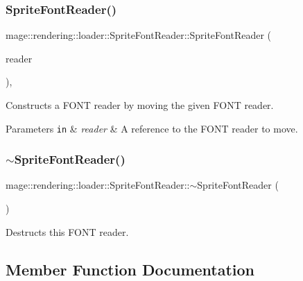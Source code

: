 \subsubsection{\texorpdfstring{Sprite\+Font\+Reader()}{SpriteFontReader()}\hspace{0.1cm}{\footnotesize\ttfamily [3/3]}}
{\footnotesize\ttfamily mage\+::rendering\+::loader\+::\+Sprite\+Font\+Reader\+::\+Sprite\+Font\+Reader (\begin{DoxyParamCaption}\item[{\hyperlink{classmage_1_1rendering_1_1loader_1_1_sprite_font_reader}{Sprite\+Font\+Reader} \&\&}]{reader }\end{DoxyParamCaption})\hspace{0.3cm}{\ttfamily [default]}, {\ttfamily [noexcept]}}

Constructs a F\+O\+NT reader by moving the given F\+O\+NT reader.


\begin{DoxyParams}[1]{Parameters}
\mbox{\tt in}  & {\em reader} & A reference to the F\+O\+NT reader to move. \\
\hline
\end{DoxyParams}
\hypertarget{classmage_1_1rendering_1_1loader_1_1_sprite_font_reader_a206d696476cd2ed6606932c549cd0c6c}{}\label{classmage_1_1rendering_1_1loader_1_1_sprite_font_reader_a206d696476cd2ed6606932c549cd0c6c} 
\subsubsection{\texorpdfstring{$\sim$\+Sprite\+Font\+Reader()}{~SpriteFontReader()}}
{\footnotesize\ttfamily mage\+::rendering\+::loader\+::\+Sprite\+Font\+Reader\+::$\sim$\+Sprite\+Font\+Reader (\begin{DoxyParamCaption}{ }\end{DoxyParamCaption})\hspace{0.3cm}{\ttfamily [default]}}

Destructs this F\+O\+NT reader. 

\subsection{Member Function Documentation}
\hypertarget{classmage_1_1rendering_1_1loader_1_1_sprite_font_reader_a0523d92193229bced5669791524e4ea9}{}\label{classmage_1_1rendering_1_1loader_1_1_sprite_font_reader_a0523d92193229bced5669791524e4ea9} 
